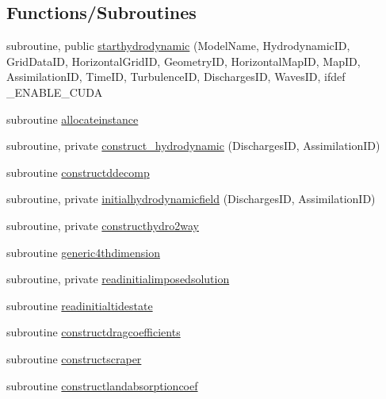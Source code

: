 \subsection*{Functions/\+Subroutines}
\begin{DoxyCompactItemize}
\item 
subroutine, public \mbox{\hyperlink{namespacemodulehydrodynamic_a5f577b4eaf3f21452c288af53dcffb69}{starthydrodynamic}} (Model\+Name, Hydrodynamic\+ID, Grid\+Data\+ID, Horizontal\+Grid\+ID, Geometry\+ID, Horizontal\+Map\+ID, Map\+ID, Assimilation\+ID, Time\+ID, Turbulence\+ID, Discharges\+ID, Waves\+ID, ifdef \+\_\+\+E\+N\+A\+B\+L\+E\+\_\+\+C\+U\+DA
\item 
subroutine \mbox{\hyperlink{namespacemodulehydrodynamic_aacffef10ed59e5eb96916e7a72dbff26}{allocateinstance}}
\item 
subroutine, private \mbox{\hyperlink{namespacemodulehydrodynamic_a71f29b5c93f202c8e783ecb892b1b497}{construct\+\_\+hydrodynamic}} (Discharges\+ID, Assimilation\+ID)
\item 
subroutine \mbox{\hyperlink{namespacemodulehydrodynamic_ac05ecc81fa8270b9ed0247f513b0c5d9}{constructddecomp}}
\item 
subroutine, private \mbox{\hyperlink{namespacemodulehydrodynamic_a4627a0c2583b12e5490b0ddf81573972}{initialhydrodynamicfield}} (Discharges\+ID, Assimilation\+ID)
\item 
subroutine, private \mbox{\hyperlink{namespacemodulehydrodynamic_ab991fa8b939ae331f5361fbce83a2ed9}{constructhydro2way}}
\item 
subroutine \mbox{\hyperlink{namespacemodulehydrodynamic_a1edb0b24590f8074445b2a82f3bf1daf}{generic4thdimension}}
\item 
subroutine, private \mbox{\hyperlink{namespacemodulehydrodynamic_a8c1095168f036a4615b7ef4ad633717b}{readinitialimposedsolution}}
\item 
subroutine \mbox{\hyperlink{namespacemodulehydrodynamic_ac4bc667c44ab1d14eaa3efa39b224aa1}{readinitialtidestate}}
\item 
subroutine \mbox{\hyperlink{namespacemodulehydrodynamic_ae2c9c19e22a3490a8d02e575bf8dd5a7}{constructdragcoefficients}}
\item 
subroutine \mbox{\hyperlink{namespacemodulehydrodynamic_aced773f111ad70fa9ce5069abbc8a7eb}{constructscraper}}
\item 
subroutine \mbox{\hyperlink{namespacemodulehydrodynamic_a25b15c0ef46c1b48f735915c9ffdd9c2}{constructlandabsorptioncoef}}
\item 

\end{DoxyCompactItemize}
